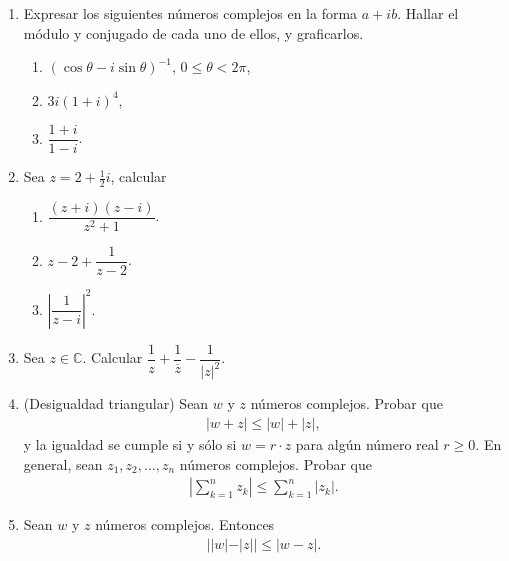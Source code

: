 \documentclass[a4paper,12pt,twoside,spanish,reqno]{amsbook}
\numberwithin{equation}{section}
\begin{document}
\begin{enumerate}[resume, topsep=6pt, itemsep=.4cm]

\item Expresar los siguientes n{ú}meros complejos en la forma $a +i b$. Hallar el módulo y conjugado de cada uno de ellos, y graficarlos.
\begin{multicols}{3}
    \begin{enumerate}
        \item $(\cos\theta - i\sin\theta)^{-1}$, $0\leq\theta<2\pi$,
        \item $3 i(1 + i)^4$,
        \item $\dfrac{1+i}{1-i}$.
    \end{enumerate}
\end{multicols}


\item Sea $z=2+\frac{1}{2}i$, calcular
\begin{multicols}{3}
    \begin{enumerate}
        \item $\dfrac{(z+i)(z-i)}{z^2+1}$.
        \item $z-2 + \dfrac{1}{z-2}$.
        \item $\left|\dfrac{1}{z-i}\right|^2$.
    \end{enumerate}
\end{multicols}

\item Sea $z\in\mathbb{C}$. Calcular $\dfrac{1}{z}+\dfrac{1}{\overline{z}} - \dfrac{1}{|z|^2}$.


\item\label{desT} (Desigualdad triangular) Sean $w$ y $z$ números complejos. Probar que
\begin{eqnarray*}
    |w + z| \leq |w| + |z|,
\end{eqnarray*}
y la igualdad se cumple si y sólo si $w= r\cdot z$ para algún número real $r \geq 0$.
En general, sean $z_1,z_2,\ldots, z_n$ números complejos. Probar que
\begin{eqnarray*}
    \left|\sum_{k=1}^{n} z_k\right| \leq \sum_{k=1}^{n} |z_k|.
\end{eqnarray*}


\item Sean $w$ y $z$ números complejos. Entonces
\begin{eqnarray*}
    ||w|-|z|| \leq |w-z|.
\end{eqnarray*}

\end{enumerate}
\end{document}
